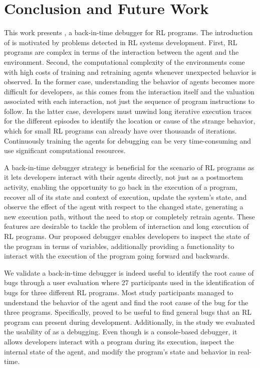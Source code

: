 
\section{Conclusion and Future Work}
\label{sec:conclusion}

This work presents \flik, a back-in-time debugger for \ac{RL} programs. The introduction of \flik 
is motivated by problems detected in \ac{RL} systems development. First, \ac{RL} programs are 
complex in terms of the interaction between the agent and the environment. Second, the computational 
complexity of the environments come with high costs of training and retraining agents whenever 
unexpected behavior is observed. 
In the former case, understanding the behavior of agents becomes more difficult for developers, as this 
comes from the interaction itself and the valuation associated with each interaction, not just the 
sequence of program instructions to follow. In the latter case, developers must unwind long iterative 
execution traces for the different episodes to identify the location or cause of the strange behavior, 
which for small \ac{RL} programs can already have over thousands of iterations. Continuously training 
the agents for debugging can be very time-consuming and use significant computational resources.

A back-in-time debugger strategy is beneficial for the scenario of \ac{RL} programs as it lets 
developers interact with their agents directly, not just as a postmortem activity, enabling the 
opportunity to go back in the execution of a program, recover all of its state and context of execution, 
update the system's state, and observe the effect of the agent with respect to the changed state, 
generating a new execution path, without the need to stop or completely retrain agents. These features 
are desirable to tackle the problem of interaction and long execution of \ac{RL} programs. Our proposed 
debugger enables developers to inspect the state of the program in terms of variables, additionally 
providing a functionality to interact with the execution of the program going forward and backwards.

We validate a back-in-time debugger is indeed useful to identify the root cause of bugs through a 
user evaluation where 27 participants used \flik in the identification of bugs for three different \ac{RL} 
programs. Most study participants managed to understand the behavior of the agent and find the root 
cause of the bug for the three programs. Specifically, \flik proved  to be useful to find general bugs that 
an \ac{RL} program can present during development. 
Additionally, in the study we evaluated the usability of \flik as a debugging. Even though \flik is a 
console-based debugger, it allows developers interact with a program during its execution, inspect 
the internal state of the agent, and modify the program's state and behavior in real-time. 


